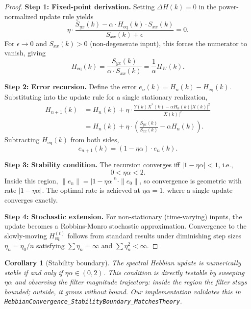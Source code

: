 \documentclass[11pt]{article}
\newtheorem{corollary}[theorem]{Corollary}
\begin{document}
\begin{proof}
\textbf{Step 1: Fixed-point derivation.}
Setting $\Delta H(k) = 0$ in the power-normalized update rule yields
\begin{equation}
\eta \cdot \frac{S_{yx}(k) - \alpha \cdot H_{\text{eq}}(k) \cdot S_{xx}(k)}{S_{xx}(k) + \epsilon} = 0.
\end{equation}
For $\epsilon \to 0$ and $S_{xx}(k) > 0$ (non-degenerate input), this
forces the numerator to vanish, giving
\begin{equation}
H_{\text{eq}}(k) = \frac{S_{yx}(k)}{\alpha \cdot S_{xx}(k)} = \frac{1}{\alpha} H_W(k).
\end{equation}

\textbf{Step 2: Error recursion.}
Define the error $e_n(k) = H_n(k) - H_{\text{eq}}(k)$. Substituting into
the update rule for a single stationary realization,
\begin{align}
H_{n+1}(k) &= H_n(k) + \eta \cdot \frac{Y(k)X^*(k) - \alpha H_n(k)|X(k)|^2}{|X(k)|^2} \\
&= H_n(k) + \eta \cdot \left(\frac{S_{yx}(k)}{S_{xx}(k)} - \alpha H_n(k)\right).
\end{align}
Subtracting $H_{\text{eq}}(k)$ from both sides,
\begin{equation}
e_{n+1}(k) = (1 - \eta\alpha) \cdot e_n(k).
\end{equation}

\textbf{Step 3: Stability condition.}
The recursion converges iff $|1 - \eta\alpha| < 1$, i.e.,
\begin{equation}
0 < \eta\alpha < 2.
\end{equation}
Inside this region, $\|e_n\| = |1 - \eta\alpha|^n \cdot \|e_0\|$, so
convergence is geometric with rate $|1 - \eta\alpha|$. The optimal rate is
achieved at $\eta\alpha = 1$, where a single update converges exactly.

\textbf{Step 4: Stochastic extension.}
For non-stationary (time-varying) inputs, the update becomes a
Robbins-Monro stochastic approximation. Convergence to the slowly-moving
$H_{\text{eq}}^{(t)}$ follows from standard results \cite{robbins1951}
under diminishing step sizes $\eta_n = \eta_0 / n$ satisfying
$\sum \eta_n = \infty$ and $\sum \eta_n^2 < \infty$.
\end{proof}

\begin{corollary}[Stability boundary]
\label{cor:stability}
The spectral Hebbian update is numerically stable if and only if
$\eta\alpha \in (0, 2)$. This condition is directly testable by sweeping
$\eta\alpha$ and observing the filter magnitude trajectory: inside the
region the filter stays bounded; outside, it grows without bound.
Our implementation validates this in
\texttt{HebbianConvergence\_StabilityBoundary\_MatchesTheory}.
\end{corollary}
\end{document}
